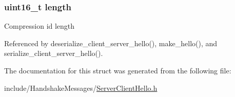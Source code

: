 \subsubsection[{\texorpdfstring{length}{length}}]{\setlength{\rightskip}{0pt plus 5cm}uint16\+\_\+t length}\hypertarget{structcompression__methods__t_a1892eba2086d12ac2b09005aeb09ea3b}{}\label{structcompression__methods__t_a1892eba2086d12ac2b09005aeb09ea3b}
Compression id length 

Referenced by deserialize\+\_\+client\+\_\+server\+\_\+hello(), make\+\_\+hello(), and serialize\+\_\+client\+\_\+server\+\_\+hello().



The documentation for this struct was generated from the following file\+:\begin{DoxyCompactItemize}
\item 
include/\+Handshake\+Messages/\hyperlink{_server_client_hello_8h}{Server\+Client\+Hello.\+h}\end{DoxyCompactItemize}
